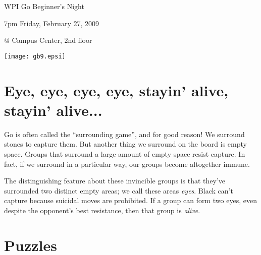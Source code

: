 \documentclass{article}
\begin{document}
\centerline{\Huge WPI Go Beginner's Night}
\centerline{\Huge 7pm Friday, February 27, 2009}
\centerline{\Huge @ Campus Center, 2nd floor}
\vfill

\begin{center}
\texttt{[image: gb9.epsi]}
\end{center}

\vfill

\newpage

\section*{Eye, eye, eye, eye, stayin' alive, stayin' alive...}

Go is often called the ``surrounding game'', and for good reason!  We
surround stones to capture them.  But another thing we
surround on the board is empty space.  Groups that surround a large
amount of empty space resist capture.  In fact, if we surround in a
particular way, our groups become altogether immune.
\begin{center}
\hspace{.2in}
\hspace{.2in}
%
%
\hspace{.2in}
\end{center}
The distinguishing feature about these invincible groups is that
they've surrounded two distinct empty areas; we call these areas
\emph{eyes}.  Black can't capture because suicidal moves are
prohibited.  If a group can form two eyes, even despite the opponent's
best resistance, then that group is \emph{alive}.


\section*{Puzzles}
\begin{center}
\hspace{.3in}
\hspace{.3in}
\end{center}
\end{document}
